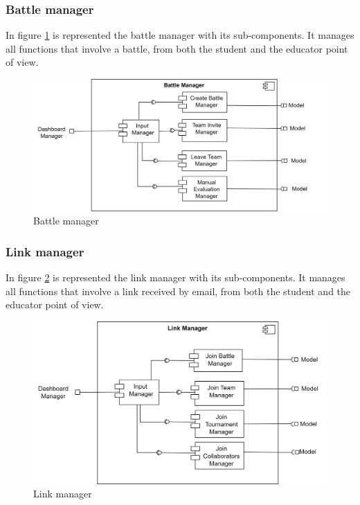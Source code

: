 \subsubsection*{Battle manager}
In figure \ref{fig:battle-man} is represented the battle manager with its sub-components. It manages all functions that involve a battle, from both the student and the educator point of view.
\begin{figure}[h]
    \centering
    \includegraphics[scale = 0.5]{images/battle-man.png}
    \caption{Battle manager}
    \label{fig:battle-man}
\end{figure}
\clearpage

\subsubsection*{Link manager}
In figure \ref{fig:link-man} is represented the link manager with its sub-components. It manages all functions that involve a link received by email, from both the student and the educator point of view.
\begin{figure}[h]
    \centering
    \includegraphics[scale = 0.5]{images/link-man.png}
    \caption{Link manager}
    \label{fig:link-man}
\end{figure}

